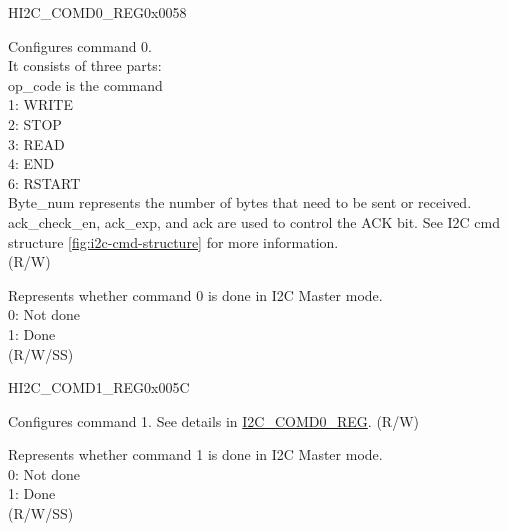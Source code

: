 \begin{register}{H}{I2C\_COMD0\_REG}{0x0058}\label{regdesc:I2CCOMD0REG}
%
%
%
\regnewline%
\begin{regdesc}\begin{reglist}
\label{fielddesc:I2CCOMMAND0}\item [I2C\_COMMAND0] Configures command 0. \\
It consists of three parts:\\ 
op\_code is the command\\
1: WRITE\\ 
2: STOP\\
3: READ\\
4: END\\
6: RSTART\\
Byte\_num represents the number of bytes that need to be sent or received.\\
ack\_check\_en, ack\_exp, and ack are used to control the ACK bit. See I2C cmd structure \ref{fig:i2c-cmd-structure} for more information. \\(R/W)
\label{fielddesc:I2CCOMMAND0DONE}\item [I2C\_COMMAND0\_DONE] Represents whether command 0 is done in I2C Master mode.\\
0: Not done \\
1: Done \\ (R/W/SS)
\end{reglist}\end{regdesc}
\end{register}


\begin{register}{H}{I2C\_COMD1\_REG}{0x005C}\label{regdesc:I2CCOMD1REG}
%
%
%
\regnewline%
\begin{regdesc}\begin{reglist}
\label{fielddesc:I2CCOMMAND1}\item [I2C\_COMMAND1] Configures command 1. See details in \hyperref[regdesc:I2CCOMD0REG]{I2C\_COMD0\_REG}. (R/W)
\label{fielddesc:I2CCOMMAND1DONE}\item [I2C\_COMMAND1\_DONE] Represents whether command 1 is done in I2C Master mode.\\
0: Not done \\
1: Done \\ (R/W/SS)
\end{reglist}\end{regdesc}
\end{register}


